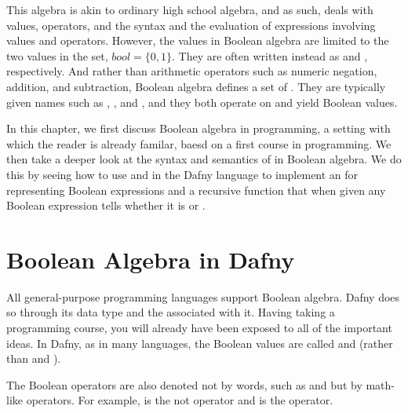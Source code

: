 \documentclass[letterpaper,10pt,english]{sphinxmanual}
\begin{document}
This algebra is akin to ordinary high school algebra, and as such,
deals with values, operators, and the syntax and the evaluation of
expressions involving values and operators.  However, the values in
Boolean algebra are limited to the two values in the set, \(bool
= \{ 0, 1\}\). They are often written instead as  and ,
respectively. And rather than arithmetic operators such as numeric
negation, addition, and subtraction, Boolean algebra defines a set of
. They are typically given names such as ,
, and , and they both operate on and yield Boolean values.

In this chapter, we first discuss Boolean algebra in programming, a
setting with which the reader is already familar, baesd on a first
course in programming. We then take a deeper look at the syntax and
semantics of  in Boolean algebra. We do this by seeing
how to use  and  in the
Dafny language to implement an  for representing
Boolean expressions and a recursive  function that when
given any Boolean expression tells whether it is  or .


\section{Boolean Algebra in Dafny}
\label{\detokenize{08-boolean-algebra:boolean-algebra-in-dafny}}
All general-purpose programming languages support Boolean
algebra. Dafny does so through its  data type and the
 associated with it. Having taking a programming course,
you will already have been exposed to all of the important ideas.
In Dafny, as in many languages, the Boolean values are called
 and  (rather than  and ).

The Boolean operators are also denoted not by words, such as  and
 but by math-like operators. For example, \sphinxstyleemphasis{!} is the not operator
and \sphinxstyleemphasis{\textbar{}\textbar{}} is the  operator.
\end{document}
